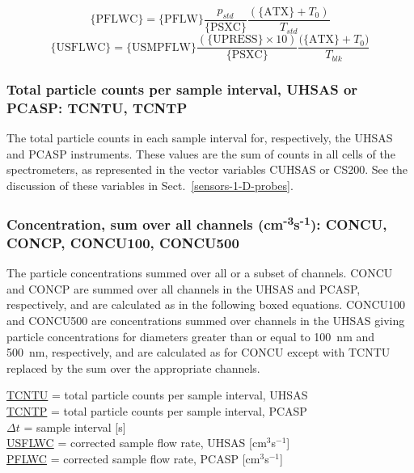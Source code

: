 \documentclass[
]{book}
\begin{document}
\begin{equation}
\mathrm{\{PFLWC\}}=\mathrm{\{PFLW\}}\frac{p_{std}}{\mathrm{\{PSXC\}}}\frac{(\mathrm{\{ATX\}}+T_{0})}{T_{std}}  
\label{eq:PFLWCbox1}
\end{equation}
\begin{equation}
\mathrm{\{USFLWC\}}=\mathrm{\{USMPFLW\}}\frac{(\mathrm{\{UPRESS\}}\times 10)} {\mathrm{\{PSXC\}}}\frac{\mathrm{(\{ATX\}}+T_{0})}{T_{blk}}  
\label{eq:PFLWCbox2}
\end{equation}

\hypertarget{tcntu-tcntp}{%
\subsubsection*{Total particle counts per sample interval, UHSAS or PCASP: TCNTU, TCNTP}\label{tcntu-tcntp}}

The total particle counts in each sample interval for, respectively, the UHSAS and PCASP instruments. These values are the sum of counts in all cells of the spectrometers, as represented in the vector variables CUHSAS or CS200. See the discussion of these variables in Sect.~\ref{sensors-1-D-probes}.

\hypertarget{concu-concp}{%
\subsubsection*{\texorpdfstring{Concentration, sum over all channels (cm\textsuperscript{-3}s\textsuperscript{-1}): CONCU, CONCP, CONCU100, CONCU500}{Concentration, sum over all channels (cm-3s-1): CONCU, CONCP, CONCU100, CONCU500}}\label{concu-concp}}

The particle concentrations summed over all or a subset of channels. CONCU and CONCP are summed over all channels in the UHSAS and PCASP, respectively, and are calculated as in the following boxed equations. CONCU100 and CONCU500 are concentrations summed over channels in the UHSAS giving particle concentrations for diameters greater than or equal to 100~nm and 500~nm, respectively, and are calculated as for CONCU except with TCNTU replaced by the sum over the appropriate channels.

\protect\hyperlink{tcntu-tcntp}{TCNTU} = total particle counts per sample interval, UHSAS\\
\protect\hyperlink{tcntu-tcntp}{TCNTP} = total particle counts per sample interval, PCASP\\
\(\Delta t\) = sample
interval {[}s{]}\\
\protect\hyperlink{pflw}{USFLWC} = corrected sample flow rate, UHSAS {[}cm\(^{3}\)s\(^{-1}\){]}\\
\protect\hyperlink{pflw}{PFLWC} = corrected sample flow rate, PCASP {[}cm\(^{3}\)s\(^{-1}\){]}
\end{document}
